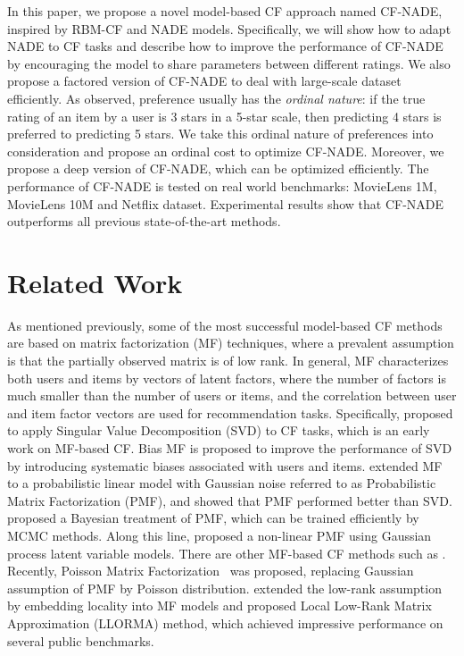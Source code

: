 \documentclass{article}
\newcommand{\cfnade}{CF-NADE\xspace}
\begin{document}
  In this paper, we propose a novel model-based CF approach named
  \cfnade, inspired by RBM-CF and NADE models. Specifically, we will
  show how to adapt NADE to CF tasks and describe how to improve the
  performance of \cfnade by encouraging the model to share parameters
  between different ratings. We also propose a factored version of
  \cfnade to deal with large-scale dataset efficiently. As
  \citet{phung2009ordinal} observed, preference usually has the
  \emph{ordinal nature}: if the true rating of an item by a user is 3
  stars in a 5-star scale, then predicting 4 stars is preferred to
  predicting 5 stars. We take this ordinal nature of preferences into
  consideration and propose an ordinal cost to optimize
  \cfnade. Moreover, we propose a deep version of \cfnade, which can
  be optimized efficiently. The performance of \cfnade is tested on
   real world benchmarks: MovieLens 1M, MovieLens 10M and Netflix
  dataset. Experimental results show that \cfnade outperforms all previous
  state-of-the-art methods.







\section{Related Work}
\label{sec:related_work}

As mentioned previously, some of the most successful model-based CF
methods are based on matrix factorization (MF) techniques, where a
prevalent assumption is that the partially observed matrix is of low
rank. In general, MF characterizes both users and items by
vectors of latent factors, where the number of factors is much smaller
than the number of users or items, and the correlation between user
and item factor vectors are used for recommendation
tasks. Specifically, \citet{billsus1998learning} proposed to apply
Singular Value Decomposition (SVD) to CF tasks, which is an early work
on MF-based CF. Bias MF \cite{koren2009matrix} is proposed to improve
the performance of SVD by introducing systematic biases associated
with users and items. \citet{mnih2007probabilistic} extended MF to a
probabilistic linear model with Gaussian noise referred to as
Probabilistic Matrix Factorization (PMF), and showed that PMF
performed better than SVD. \citet{salakhutdinov2008bayesian} proposed
a Bayesian treatment of PMF, which can be trained efficiently by MCMC
methods. Along this line, \citet{lawrence2009non} proposed a non-linear
PMF using Gaussian process latent variable models. There are other
MF-based CF methods such as
\citep{rennie2005fast,mackey2011divide}. Recently, Poisson Matrix
Factorization~\citep{gopalan2014content,gopalan2014bayesian,gopalan2013scalable}
was proposed, replacing Gaussian assumption of PMF by Poisson
distribution. \citet{lee2013local} extended the low-rank assumption by
embedding locality into MF models and proposed Local Low-Rank Matrix
Approximation (LLORMA) method, which achieved impressive performance on several public benchmarks.
\end{document}
